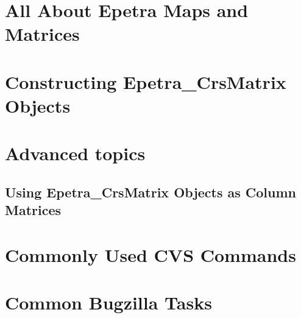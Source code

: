 \documentclass[12pt,relax]{EpetraUserGuide}
\newcommand{\crsmatrix}{Epetra\_CrsMatrix}
\begin{document}
\section{All About Epetra Maps and Matrices}
\label{Section:MapsAndMatrices}

\section{Constructing \crsmatrix{} Objects}
\label{Section:ConstructingCrsMatrices}

\section{ Advanced topics}
\subsection {Using \crsmatrix{} Objects as Column Matrices}

\clearpage



\appendix
\section{Commonly Used CVS Commands}
\label{Section:CVS}
\section{Common Bugzilla Tasks}
\label{Section:Bugzilla}
\end{document}
